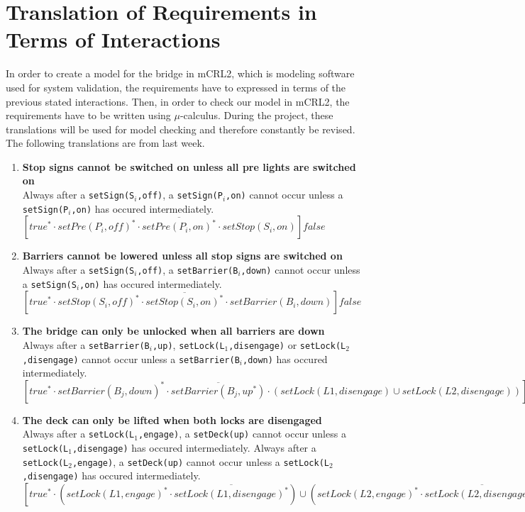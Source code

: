 \section{Translation of Requirements in Terms of Interactions}
\label{sec:trans}

In order to create a model for the bridge in mCRL2, which is modeling software used for system validation, the requirements have to expressed in terms of the previous stated interactions. Then, in order to check our model in mCRL2, the requirements have to be written using $\mu$-calculus. During the project, these translations will be used for model checking and therefore constantly be revised. The following translations are from last week.

\begin{enumerate}
	\item \textbf{Stop signs cannot be switched on unless all pre lights are switched on}\\
	Always after a \texttt{setSign(S$_i$,off)}, a \texttt{setSign(P$_i$,on)} cannot occur unless a \texttt{setSign(P$_i$,on)} has occured intermediately.\\
	$[true^* \cdot setPre(P_i, off)^{*} \cdot \overline{setPre(P_i, on)^{*}} \cdot setStop(S_i, on)]false$
	
	\item \textbf{Barriers cannot be lowered unless all stop signs are switched on}\\
	Always after a \texttt{setSign(S$_i$,off)}, a \texttt{setBarrier(B$_i$,down)} cannot occur unless a \texttt{setSign(S$_i$,on)} has occured intermediately.\\
	$[true^* \cdot setStop(S_i, off)^{*} \cdot \overline{setStop(S_i, on)^{*}} \cdot setBarrier(B_i, down)]false$

	\item \textbf{The bridge can only be unlocked when all barriers are down}\\
	Always after a \texttt{setBarrier(B$_i$,up)}, \texttt{setLock(L$_1$,disengage)} or \texttt{setLock(L$_2$,disengage)} cannot occur unless a \texttt{setBarrier(B$_i$,down)} has occured intermediately.\\
	$[true^* \cdot setBarrier(B_j, down)^{*} \cdot \overline{setBarrier(B_j, up^{*})} \cdot (setLock(L1, disengage) \cup setLock(L2, disengage))]false$

	\item	\textbf{The deck can only be lifted when both locks are disengaged}\\
	Always after a \texttt{setLock(L$_1$,engage)}, a \texttt{setDeck(up)} cannot occur unless a \texttt{setLock(L$_1$,disengage)} has occured intermediately. 
	Always after a \texttt{setLock(L$_2$,engage)}, a \texttt{setDeck(up)} cannot occur unless a \texttt{setLock(L$_2$,disengage)} has occured intermediately.\\
	$[true^* \cdot (setLock(L1, engage)^{*} \cdot \overline{setLock(L1, disengage)^{*}}) \cup (setLock(L2, 	engage)^{*} \cdot \overline{setLock(L2, disengage)^{*}}) \cdot setDeck(up)]false$


\end{enumerate}
